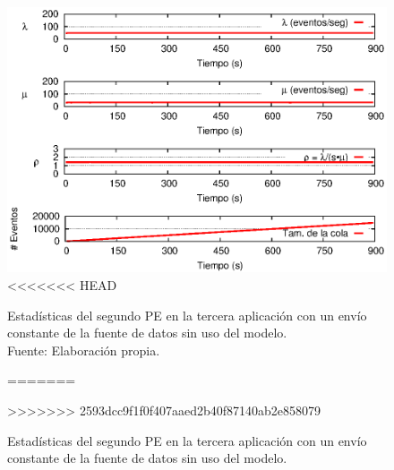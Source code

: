 \begin{figure}[!htp]
    \centering
    \captionsetup{justification=centering}
    \includegraphics[scale=1]{images/exp/app3/sm/logical/statusTwoPE.eps}
<<<<<<< HEAD
    \caption[Estadísticas del segundo PE en la tercera aplicación con un envío constante de la fuente de datos sin uso del modelo.]{Estadísticas del segundo PE en la tercera aplicación con un envío constante de la fuente de datos sin uso del modelo.\\Fuente: Elaboración propia.}
=======
    \caption{Estad\'isticas del segundo PE en la tercera aplicaci\'on con un env\'io constante de la fuente de datos sin uso del modelo.}
>>>>>>> 2593dcc9f1f0f407aaed2b40f87140ab2e858079
    \label{fig:app3-statusTwoPE-sm}
\end{figure}

